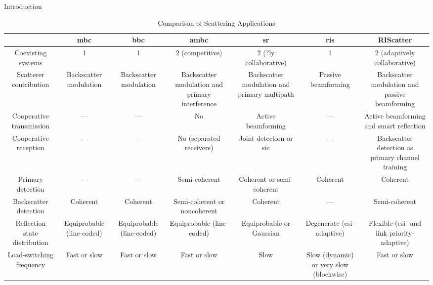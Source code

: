 \documentclass[journal]{IEEEtran}
\begin{document}
\begin{section}{Introduction}
	\begin{table*}[]
		\caption{Comparison of Scattering Applications}
		\begin{tabularx}{\textwidth}{CCCCCCC}
			\toprule
			                              & \gls{mbc}                 & \gls{bbc}                 & \gls{ambc}                                      & \gls{sr}                                     & \gls{ris}                               & RIScatter                                         \\ \midrule
			Coexisting systems            & 1                         & 1                         & 2 (competitive)                                 & 2 (?ly collaborative)                        & 1                                       & 2 (adaptively collaborative)                      \\ \midrule
			Scatterer contribution        & Backscatter modulation    & Backscatter modulation    & Backscatter modulation and primary interference & Backscatter modulation and primary multipath & Passive beamforming                     & Backscatter modulation and passive beamforming    \\ \midrule
			Cooperative transmission      & ---                       & ---                       & No                                              & Active beamforming                           & ---                                     & Active beamforming and smart reflection           \\ \midrule
			Cooperative reception         & ---                       & ---                       & No (separated receivers)                        & Joint detection or \gls{sic}                 & ---                                     & Backscatter detection as primary channel training \\ \midrule
			Primary detection             & ---                       & ---                       & Semi-coherent                                   & Coherent or semi-coherent                    & Coherent                                & Coherent                                          \\ \midrule
			Backscatter detection         & Coherent                  & Coherent                  & Semi-coherent or noncoherent                    & Coherent                                     & ---                                     & Semi-coherent                                     \\ \midrule
			Reflection state distribution & Equiprobable (line-coded) & Equiprobable (line-coded) & Equiprobable (line-coded)                       & Equiprobable or Gaussian                     & Degenerate (\gls{csi}-adaptive)         & Flexible (\gls{csi}- and link priority-adaptive)  \\ \midrule
			Load-switching frequency      & Fast or slow              & Fast or slow              & Fast or slow                                    & Slow                                         & Slow (dynamic) or very slow (blockwise) & Fast or slow                                      \\ \bottomrule
		\end{tabularx}
	\end{table*}


\end{section}
\end{document}
